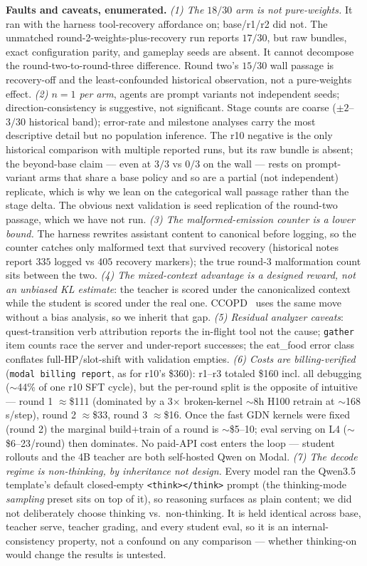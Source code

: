 \documentclass[11pt]{article}
\begin{document}
\textbf{Faults and caveats, enumerated.}
\emph{(1) The $18/30$ arm is not pure-weights.} It ran with the harness tool-recovery affordance
on; base/r1/r2 did not. The unmatched round-2-weights-plus-recovery run reports $17/30$, but raw
bundles, exact configuration parity, and gameplay seeds are absent. It cannot decompose the
round-two-to-round-three difference. Round two's $15/30$ wall passage is recovery-off and the
least-confounded historical observation, not a pure-weights effect. \emph{(2) $n{=}1$ per arm}, agents are prompt
variants not independent seeds; direction-consistency is suggestive, not significant. Stage
counts are coarse ($\pm 2$--$3/30$ historical band); error-rate and milestone analyses carry the
most descriptive detail but no population inference. The r10 negative is the only historical
comparison with multiple reported runs, but its raw bundle is absent; the beyond-base claim --- even
at $3/3$ vs $0/3$ on the wall --- rests on prompt-variant arms that share a base policy and so
are a partial (not independent) replicate, which is why we lean on the categorical wall passage
rather than the stage delta. The obvious next validation is seed replication of the round-two
passage, which we have not run. \emph{(3) The malformed-emission counter is a lower bound.} The harness
rewrites assistant content to canonical before logging, so the counter catches only malformed text
that survived recovery (historical notes report $335$ logged vs $405$ recovery markers); the true
round-3 malformation count sits between the two. \emph{(4) The mixed-context advantage is a
designed reward, not an unbiased KL estimate}: the teacher is scored under the canonicalized
context while the student is scored under the real one. CCOPD~\cite{ccopd} uses the same move
without a bias analysis, so we inherit that gap. \emph{(5) Residual analyzer caveats}:
quest-transition verb attribution reports the in-flight tool not the cause; \texttt{gather} item
counts race the server and under-report successes; the eat\_food error class conflates
full-HP/slot-shift with validation empties. \emph{(6) Costs are billing-verified} (\texttt{modal
billing report}, as for r10's \$360): r1--r3 totaled \$160 incl. all debugging
($\sim$44\% of one r10 SFT cycle), but the per-round split is the opposite of intuitive ---
round 1 $\approx$\$111 (dominated by a 3$\times$ broken-kernel $\sim$8h H100 retrain at
$\sim$168\,s/step), round 2 $\approx$\$33, round 3 $\approx$\$16. Once the fast GDN kernels were
fixed (round 2) the marginal build+train of a round is $\sim$\$5--10; eval serving on L4
($\sim$\$6--23/round) then dominates. No paid-API cost enters the loop --- student rollouts and
the 4B teacher are both self-hosted Qwen on Modal. \emph{(7) The decode regime is non-thinking, by
inheritance not design.} Every model ran the Qwen3.5 template's default closed-empty
\texttt{<think></think>} prompt (the thinking-mode \emph{sampling} preset sits on top of it), so
reasoning surfaces as plain content; we did not deliberately choose thinking vs.\ non-thinking. It is
held identical across base, teacher serve, teacher grading, and every student eval, so it is an
internal-consistency property, not a confound on any comparison --- whether thinking-on would change
the results is untested.
\end{document}

